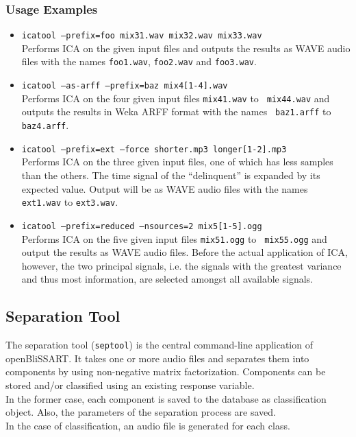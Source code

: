 \subsubsection{Usage Examples}

\begin{itemize}
  \item {\tt icatool --prefix=foo mix31.wav mix32.wav mix33.wav}\\
    Performs ICA on the given input files and outputs the results as WAVE audio
    files with the names {\tt foo1.wav}, {\tt foo2.wav} and {\tt foo3.wav}.
  \item {\tt icatool --as-arff --prefix=baz mix4[1-4].wav}\\ 
    Performs ICA on the four given input files {\tt mix41.wav} to {\tt
    mix44.wav} and outputs the results in Weka ARFF format with the names {\tt
    baz1.arff} to {\tt baz4.arff}.
  \item {\tt icatool --prefix=ext --force shorter.mp3 longer[1-2].mp3}\\
    Performs ICA on the three given input files, one of which has less samples
    than the others. The time signal of the ``delinquent'' is expanded by its
    expected value. Output will be as WAVE audio files with the names {\tt
      ext1.wav} to {\tt ext3.wav}.
  \item {\tt icatool --prefix=reduced --nsources=2 mix5[1-5].ogg}\\
    Performs ICA on the five given input files {\tt mix51.ogg} to {\tt
      mix55.ogg} and output the results as WAVE audio files. Before the actual
    application of ICA, however, the two principal signals, i.e. the signals
    with the greatest variance and thus most information, are selected amongst
    all available signals.
\end{itemize}


\subsection{Separation Tool}
\label{section:septool}

The separation tool (\verb!septool!) is the central command-line application of
openBliSSART. It takes one or more audio files and separates
them into components by using non-negative matrix factorization.  Components can
be stored and/or classified using an existing response variable.\\
In the former case, each component is saved to the database as classification
object. Also, the parameters of the separation process are saved.\\
In the case of classification, an audio file is generated for each class.\\

